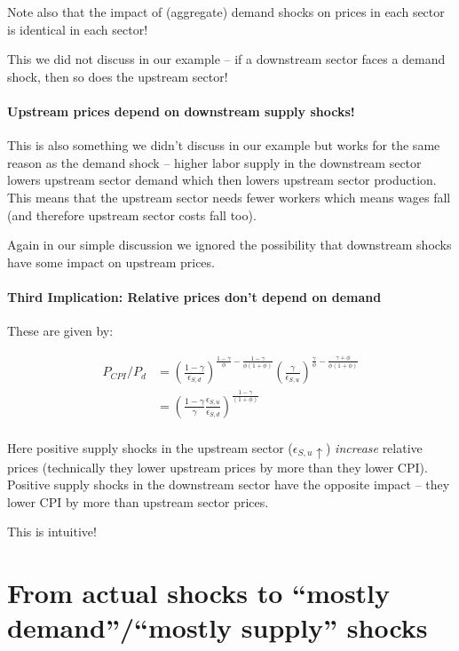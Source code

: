 \documentclass[12pt,english]{article}
\begin{document}
Note also that the impact of (aggregate) demand shocks on prices in each sector is identical in each sector!

This we did not discuss in our example -- if a downstream sector faces a demand shock, then so does the upstream sector!

\paragraph{Upstream prices depend on downstream supply shocks!}

This is also something we didn't discuss in our example but works for the same reason as the demand shock -- higher labor supply in the downstream sector lowers upstream sector demand which then lowers upstream sector production. This means that the upstream sector needs fewer workers which means wages fall (and therefore upstream sector costs fall too).

Again in our simple discussion we ignored the possibility that downstream shocks have some impact on upstream prices.

\paragraph{Third Implication: Relative prices don't depend on demand}

These are given by:

\begin{align*}
	P_{CPI}/P_d&=\left(\frac{1-\gamma}{\epsilon_{S,d}}\right)^{\frac{1-\gamma}{\phi}-\frac{1-\gamma}{\phi(1+\phi)}}\left(\frac{\gamma}{\epsilon_{S,u}}\right)^{\frac{\gamma}{\phi}-\frac{\gamma+\phi}{\phi(1+\phi)}}\\
	&=\left(\frac{1-\gamma}{\gamma}\frac{\epsilon_{S,u}}{\epsilon_{S,d}}\right)^{\frac{1-\gamma}{(1+\phi)}}\\
\end{align*}

Here positive supply shocks in the upstream sector ($\epsilon_{S,u}\uparrow$) \emph{increase} relative prices (technically they lower upstream prices by more than they lower CPI). Positive supply shocks in the downstream sector have the opposite impact -- they lower CPI by more than upstream sector prices.

This is intuitive!

\section*{From actual shocks to ``mostly demand''/``mostly supply'' shocks}
\end{document}

